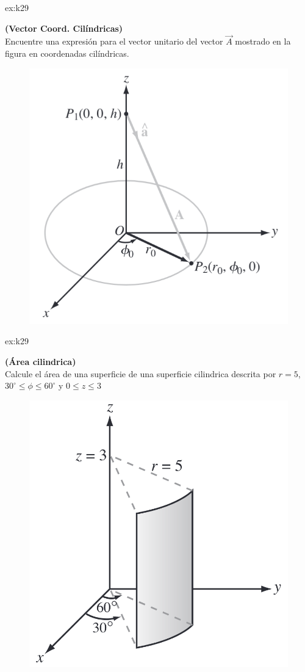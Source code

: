  \begin{multicols}{2}

    \begin{excercise}[][][$\vec{e}_A=\displaystyle{\frac{r_0\vec{e}_r-h\vec{k}}{\sqrt{r_0^2+h^2}}}$]{ex:k29}{
        \textbf{(Vector Coord. Cilíndricas)}\\
        Encuentre una expresión para el vector unitario del vector $\vec{A}$ mostrado en la figura en coordenadas cilíndricas.
        \begin{figure}[H]
            \centering
            \includegraphics[width=0.7\linewidth]{img/01_electric-field/1.png}
        \end{figure}
    }
    \end{excercise}

    \begin{excercise}[][][$S=\displaystyle{\frac{5\pi}{2}}$]{ex:k29}{ \textbf{(Área cilindrica)}\\
    Calcule el área de una superficie de una superficie cilindrica descrita por $r=5$, $30^\circ\leq\phi\leq 60^\circ$ y $0\leq z\leq 3$            
    \begin{figure}[H]
                \centering
                \includegraphics[width=0.7\linewidth]{img/01_electric-field/2.png}
            \end{figure}
         }
    \end{excercise}


\end{multicols}
